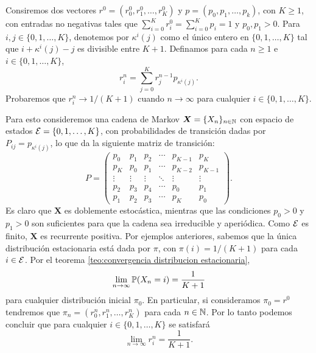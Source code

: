 \begin{example}
    Consiremos dos vectores $r^0 = (r_0^0, r_1^0, \ldots, r_K^0)$ y $p = (p_0, p_1, \ldots, p_k)$, con $K \geq 1$, con entradas no negativas tales que $\sum_{i = 0}^K r_i^0 = \sum_{i = 0}^K p_i = 1$ y $p_0, p_1 > 0$. Para $i, j \in \{0, 1, \ldots, K\}$, denotemos por $\kappa^i(j)$ como el único entero en $\{0, 1, \ldots, K\}$ tal que $i + \kappa^i(j) - j$ es divisible entre $K+1$. Definamos para cada $n \geq 1$ e $i \in \{0, 1, \ldots, K\}$, 
    \[
        r_i^n = \sum_{j = 0}^K r_{j}^{n-1} p_{\kappa^i(j)}.
    \]
    Probaremos que $r_i^n \to 1/(K+1)$ cuando $n \to \infty$ para cualquier $i \in \{0, 1, \ldots, K\}$.

    Para esto consideremos una cadena de Markov $\bm X = \{X_n\}_{n \in \mathbb{N}}$ con espacio de estados $\mathcal{E} = \{0, 1, \ldots, K\}$, con probabilidades de transición dadas por $P_{ij} = p_{\kappa^i(j)}$, lo que da la siguiente matriz de transición:
    \[
        P = \begin{pmatrix}
            p_0 & p_1 & p_2 & \cdots & p_{K-1} & p_K \\
            p_K & p_0 & p_1 & \cdots & p_{K-2} & p_{K-1} \\
            \vdots & \vdots & \vdots & \ddots & \vdots & \vdots \\
            p_2 & p_3 & p_4 & \cdots & p_0 & p_1 \\
            p_1 & p_2 & p_3 & \cdots & p_K & p_0
        \end{pmatrix}.
    \]
    Es claro que $\bm X$ es doblemente estocástica, mientras que las condiciones $p_0 > 0$ y $p_1 > 0$ son suficientes para que la cadena sea irreducible y aperiódica. Como $\mathcal{E}$ es finito, $\bm X$ es recurrente positiva. Por ejemplos anteriores, sabemos que la única distribución estacionaria está dada por $\pi$, con $\pi(i) = 1/(K+1)$ para cada $i \in \mathcal{E}$. Por el teorema \ref{teo:convergencia distribucion estacionaria}, 
    \[
        \lim_{n \to \infty} \mathbb{P}(X_n = i) = \frac{1}{K+1}
    \]
    para cualquier distribución inicial $\pi_0$. En particular, si consideramos $\pi_0 = r^0$ tendremos que $\pi_n = (r_0^n, r_1^n, \ldots, r_K^n)$ para cada $n \in \mathbb{N}$. Por lo tanto podemos concluir que para cualquier $i \in \{0, 1, \ldots, K\}$ se satisfará
    \[
        \lim_{n \to \infty} r_i^n = \frac{1}{K+1}.
    \]
\end{example}